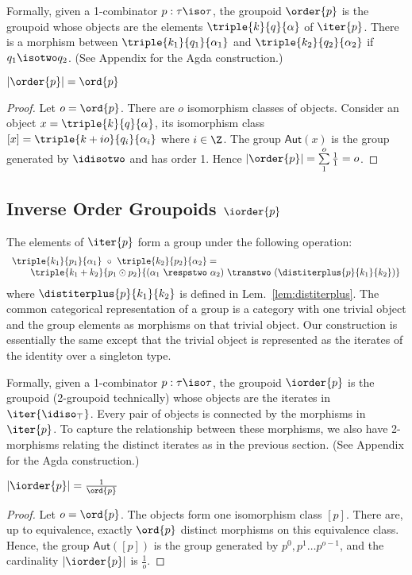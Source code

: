 Formally, given a 1-combinator $p : \tau\iso\tau$, the groupoid
$\order{p}$ is the groupoid whose objects are the elements
$\triple{k}{q}{\alpha}$ of $\iter{p}$. There is a morphism between
$\triple{k_1}{q_1}{\alpha_1}$ and $\triple{k_2}{q_2}{\alpha_2}$ if
$q_1 \isotwo q_2$. (See Appendix for the Agda construction.)

\begin{lemma}
  $|\order{p}| = \ord{p}$
\end{lemma}
\begin{proof}
  Let $o = \ord{p}$. There are $o$ isomorphism classes of
  objects. Consider an object $x = \triple{k}{q}{\alpha}$, its
  isomorphism class $[x] = \triple{k+io}{q_i}{\alpha_i}$ where
  $i \in \Z$. The group $\textsf{Aut}(x)$ is the group generated by
  $\idisotwo$ and has order 1. Hence
  $|\order{p}| = \sum\limits_{1}^{o}\frac{1}{1} = o$.
\end{proof}

\subsection{Inverse Order Groupoids $\iorder{p}$}

The elements of $\iter{p}$ form a group under the following operation:
\[\begin{array}{l}
\triple{k_1}{p_1}{\alpha_1} ~\circ~ \triple{k_2}{p_2}{\alpha_2} = \\
\qquad  \triple{k_1+k_2}{p_1 \odot p_2}{(\alpha_1 ~\respstwo~
    \alpha_2)~\transtwo~(\distiterplus{p}{k_1}{k_2})}
\end{array}\]
where $\distiterplus{p}{k_1}{k_2}$ is defined in
Lem.~\ref{lem:distiterplus}. The common categorical representation of
a group is a category with one trivial object and the group elements
as morphisms on that trivial object. Our construction is essentially
the same except that the trivial object is represented as the iterates
of the identity over a singleton type.

Formally, given a 1-combinator $p : \tau\iso\tau$, the groupoid
$\iorder{p}$ is the groupoid (2-groupoid technically) whose objects
are the iterates in $\iter{\idiso_{\top}}$. Every pair of objects is
connected by the morphisms in $\iter{p}$. To capture the relationship
between these morphisms, we also have 2-morphisms relating the
distinct iterates as in the previous section. (See Appendix for the
Agda construction.)

\begin{lemma}
  $|\iorder{p}| = \frac{1}{\ord{p}}$
\end{lemma}
\begin{proof}
  Let $o = \ord{p}$. The objects form one isomorphism class
  $[p]$. There are, up to equivalence, exactly $\ord{p}$ distinct
  morphisms on this equivalence class. Hence, the group
  $\textsf{Aut}([p])$ is the group generated by
  $p^0, p^1 \dots p^{o-1}$, and the cardinality $|\iorder{p}|$ is
  $\frac{1}{o}$.
\end{proof}


